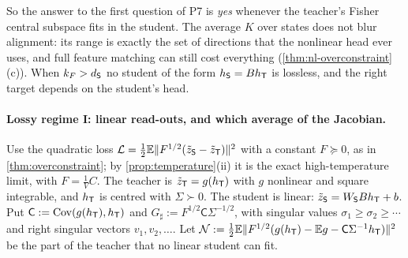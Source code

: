 So the answer to the first question of P7 is \emph{yes} whenever the teacher's Fisher central subspace fits in the
student. The average $K$ over states does not blur alignment: its range is exactly the set of directions that the
nonlinear head ever uses, and full feature matching can still cost everything (\cref{thm:nl-overconstraint}(c)). When
$k_F>d_{\mathsf{S}}$ no student of the form $h_{\mathsf{S}}=Bh_{\mathsf{T}}$ is lossless, and the right target depends on the student's head.

\paragraph{Lossy regime I: linear read-outs, and which average of the Jacobian.}
Use the quadratic loss $\mathcal{L}=\frac12\mathbb{E}\|F^{1/2}(\tilde z_{\mathsf{S}}-\tilde z_{\mathsf{T}})\|^2$ with a constant $F\succeq0$, as in
\cref{thm:overconstraint}; by \cref{prop:temperature}(ii) it is the exact high-temperature limit, with $F=\frac1VC$. The teacher is
$\tilde z_{\mathsf{T}}=g(h_{\mathsf{T}})$ with $g$ nonlinear and square integrable, and $h_{\mathsf{T}}$ is centred with $\Sigma\succ0$. The student is linear:
$\tilde z_{\mathsf{S}}=W_{\mathsf{S}} Bh_{\mathsf{T}}+b$. Put $\mathsf C:=\operatorname{Cov}(g(h_{\mathsf{T}}),h_{\mathsf{T}})$ and $G_\sharp:=F^{1/2}\mathsf C\Sigma^{-1/2}$, with singular values
$\sigma_1\ge\sigma_2\ge\cdots$ and right singular vectors $v_1,v_2,\dots$. Let
$\mathcal N:=\frac12\mathbb{E}\|F^{1/2}(g(h_{\mathsf{T}})-\mathbb{E} g-\mathsf C\Sigma^{-1}h_{\mathsf{T}})\|^2$ be the part of the teacher that no linear student can fit.

